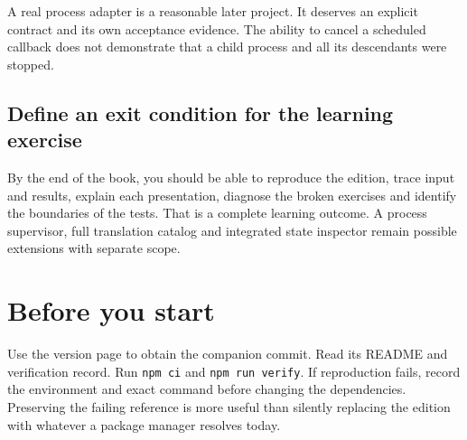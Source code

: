 A real process adapter is a reasonable later project. It deserves an explicit contract and its own acceptance evidence. The ability to cancel a scheduled callback does not demonstrate that a child process and all its descendants were stopped.

\subsection{Define an exit condition for the learning exercise}

By the end of the book, you should be able to reproduce the edition, trace input and results, explain each presentation, diagnose the broken exercises and identify the boundaries of the tests. That is a complete learning outcome. A process supervisor, full translation catalog and integrated state inspector remain possible extensions with separate scope.

\section{Before you start}

Use the version page to obtain the companion commit. Read its README and verification record. Run \texttt{npm ci} and \texttt{npm run verify}. If reproduction fails, record the environment and exact command before changing the dependencies. Preserving the failing reference is more useful than silently replacing the edition with whatever a package manager resolves today.
